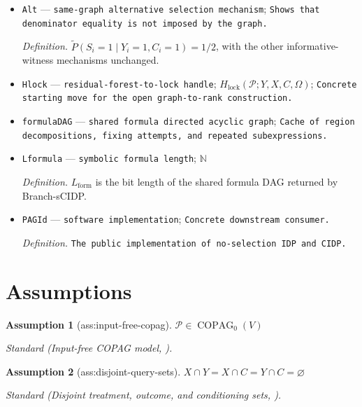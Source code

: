 \documentclass{article}
\newtheorem{assumption}{Assumption}
\begin{document}
\begin{itemize}
  \item \texttt{Alt} --- \texttt{same-\allowbreak{}graph alternative selection mechanism}; \texttt{Shows that denominator equality is not imposed by the graph.}
  \par\smallskip\noindent\emph{Definition.} \(\widetilde P(S_i=1\mid Y_i=1,C_i=1)=1/2\), with the other informative-witness mechanisms unchanged.
  \item \texttt{Hlock} --- \texttt{residual-\allowbreak{}forest-\allowbreak{}to-\allowbreak{}lock handle}; \(H_{\mathrm{lock}}(\mathcal P;Y,X,C,\Omega)\); \texttt{Concrete starting move for the open graph-\allowbreak{}to-\allowbreak{}rank construction.}
  \item \texttt{formulaDAG} --- \texttt{shared formula directed acyclic graph}; \texttt{Cache of region decompositions,\allowbreak{} fixing attempts,\allowbreak{} and repeated subexpressions.}
  \item \texttt{Lformula} --- \texttt{symbolic formula length}; \(\mathbb N\)
  \par\smallskip\noindent\emph{Definition.} \(L_{\mathrm{form}}\) is the bit length of the shared formula DAG returned by Branch-sCIDP.
  \item \texttt{PAGId} --- \texttt{software implementation}; \texttt{Concrete downstream consumer.}
  \par\smallskip\noindent\emph{Definition.} \texttt{The public implementation of no-\allowbreak{}selection IDP and CIDP.}
\end{itemize}

\section{Assumptions}

\begin{assumption}[ass:input-free-copag]\label{ass:input-free-copag}
\(\mathcal P\in\operatorname{COPAG}_0(V)\)
\par\smallskip\noindent\emph{Standard} (Input-free COPAG model, \cite{ChenMooij2026SelectedPAG}).
\end{assumption}

\begin{assumption}[ass:disjoint-query-sets]\label{ass:disjoint-query-sets}
\(X\cap Y=X\cap C=Y\cap C=\varnothing\)
\par\smallskip\noindent\emph{Standard} (Disjoint treatment, outcome, and conditioning sets, \cite{JaberRibeiroZhangBareinboim2022}).
\end{assumption}
\end{document}
